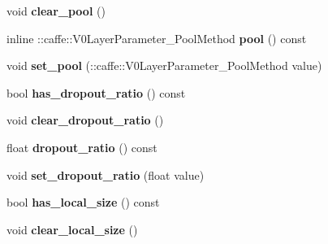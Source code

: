 \begin{DoxyCompactItemize}
\item 
\mbox{\label{classcaffe_1_1_v0_layer_parameter_a06dfc9c30abbd0a98e8de33a1b2881bc}} 
void {\bfseries clear\+\_\+pool} ()
\item 
\mbox{\label{classcaffe_1_1_v0_layer_parameter_a78b67c67d61747c548f7e53575d4d53f}} 
inline \+::caffe\+::\+V0\+Layer\+Parameter\+\_\+\+Pool\+Method {\bfseries pool} () const
\item 
\mbox{\label{classcaffe_1_1_v0_layer_parameter_a7551789b405feb2485d3be424701b7cf}} 
void {\bfseries set\+\_\+pool} (\+::caffe\+::\+V0\+Layer\+Parameter\+\_\+\+Pool\+Method value)
\item 
\mbox{\label{classcaffe_1_1_v0_layer_parameter_a72d1d7c9eae75df76f09eadcc27f1ab0}} 
bool {\bfseries has\+\_\+dropout\+\_\+ratio} () const
\item 
\mbox{\label{classcaffe_1_1_v0_layer_parameter_ab02d95ef6e6ccf7e79815d57f26dc5fd}} 
void {\bfseries clear\+\_\+dropout\+\_\+ratio} ()
\item 
\mbox{\label{classcaffe_1_1_v0_layer_parameter_a696a26410e90ca34c1d3f8ff29fe50cb}} 
float {\bfseries dropout\+\_\+ratio} () const
\item 
\mbox{\label{classcaffe_1_1_v0_layer_parameter_a30aafc5d931b49d751d07f242779bde9}} 
void {\bfseries set\+\_\+dropout\+\_\+ratio} (float value)
\item 
\mbox{\label{classcaffe_1_1_v0_layer_parameter_a83f0bfabbc5a6c3c9388e0298718ea79}} 
bool {\bfseries has\+\_\+local\+\_\+size} () const
\item 
\mbox{\label{classcaffe_1_1_v0_layer_parameter_ad35e52c58c2ec468246bfa20470ceb47}} 
void {\bfseries clear\+\_\+local\+\_\+size} ()
\item 
\mbox{\label{classcaffe_1_1_v0_layer_parameter_a329084e81ca934506c3b9161834dd9e3}} 

\end{DoxyCompactItemize}
